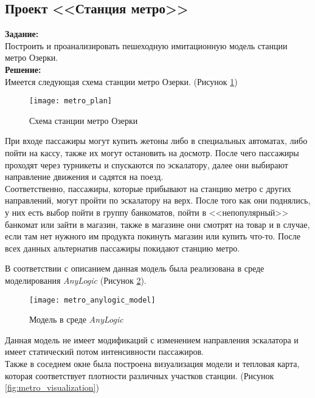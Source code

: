 \subsection*{Проект <<Станция метро>>}

\textbf{Задание:}\\
Построить и проанализировать пешеходную имитационную модель станции метро Озерки.\\

\textbf{Решение:}\\
Имеется следующая схема станции метро Озерки. (Рисунок \ref{fig:metro_plan})
\begin{figure}[h]
	\centering \texttt{[image: metro\_plan]}
	\caption{Схема станции метро Озерки}
	\label{fig:metro_plan}
\end{figure}

При входе пассажиры могут купить жетоны либо в специальных автоматах, либо пойти на кассу, также их могут остановить на досмотр. После чего пассажиры проходят через турникеты и спускаются по эскалатору, далее они выбирают направление движения и садятся на поезд.\\

Соответственно, пассажиры, которые прибывают на станцию метро с других направлений, могут пройти по эскалатору на верх. После того как они поднялись, у них есть выбор пойти в группу банкоматов, пойти в <<непопулярный>> банкомат или зайти в магазин, также в магазине они смотрят на товар и в случае, если там нет нужного им продукта покинуть магазин или купить что-то. После всех данных альтернатив пассажиры покидают станцию метро.

\newpage

В соответствии с описанием данная модель была реализована в среде моделирования \textit{AnyLogic} (Рисунок \ref{fig:metro_anylogic_model}).

\begin{figure}[h]
	\centering \texttt{[image: metro\_anylogic\_model]}
	\caption{Модель в среде \textit{AnyLogic}}
	\label{fig:metro_anylogic_model}
\end{figure}

Данная модель не имеет модификаций с изменением направления эскалатора и имеет статический потом интенсивности пассажиров.\\

Также в соседнем окне была построена визуализация модели и тепловая карта, которая соответствует плотности различных участков станции. (Рисунок \ref{fig:metro_visualization})

